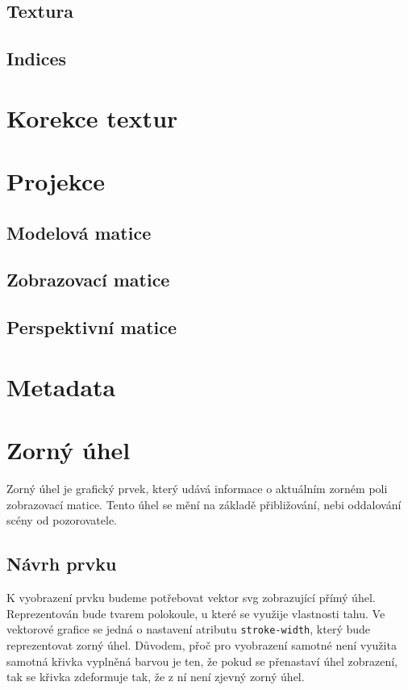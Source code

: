 \subsection{Textura}
\subsection{Indices}

\section{Korekce textur}


 


\section{Projekce}
\subsection{Modelová matice}
\subsection{Zobrazovací matice}
\subsection{Perspektivní matice}

\section{Metadata}

\newpage

\section{Zorný úhel}
Zorný úhel je grafický prvek, který udává informace o aktuálním zorném poli zobrazovací matice. Tento úhel se mění na základě přibližování, nebi oddalování scény od pozorovatele. 

\subsection{Návrh prvku}
K vyobrazení prvku budeme potřebovat vektor svg zobrazující přímý úhel. Reprezentován bude tvarem polokoule, u které se využije vlastnosti tahu. Ve vektorové grafice se jedná o nastavení atributu \texttt{stroke-width}, který bude reprezentovat zorný úhel. Důvodem, přoč pro vyobrazení samotné není využita samotná křivka vyplněná barvou je ten, že pokud se přenastaví úhel zobrazení, tak se křivka zdeformuje tak, že z ní není zjevný zorný úhel.


